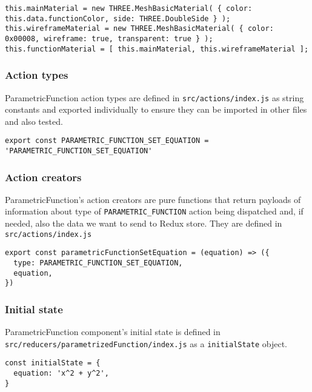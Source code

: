 \begin{lstlisting}[caption={\texttt{parametricfunction} A-Frame component init function.},captionpos=b]
this.mainMaterial = new THREE.MeshBasicMaterial( { color: this.data.functionColor, side: THREE.DoubleSide } );
this.wireframeMaterial = new THREE.MeshBasicMaterial( { color: 0x00008, wireframe: true, transparent: true } );
this.functionMaterial = [ this.mainMaterial, this.wireframeMaterial ];
\end{lstlisting}
    
\subsubsection{Action types}
ParametricFunction action types are defined in \texttt{src/actions/index.js} as string constants and exported individually to ensure they can be imported in other files and also tested.

\begin{lstlisting}[caption={\texttt{parametricFunction} action types.},captionpos=b]
export const PARAMETRIC_FUNCTION_SET_EQUATION = 'PARAMETRIC_FUNCTION_SET_EQUATION'
\end{lstlisting}

\subsubsection{Action creators}
ParametricFunction's action creators are pure functions that return payloads of information about type of \texttt{PARAMETRIC_FUNCTION} action being dispatched and, if needed, also the data we want to send to Redux store. They are defined in \texttt{src/actions/index.js}

\begin{lstlisting}[caption={Action for setting the function for 3D visualization.},captionpos=b]
export const parametricFunctionSetEquation = (equation) => ({
  type: PARAMETRIC_FUNCTION_SET_EQUATION,
  equation,
})
\end{lstlisting}

\subsubsection{Initial state}
ParametricFunction component's initial state is defined in \texttt{src/reducers/parametrizedFunction/index.js} as a \texttt{initialState} object.

\begin{lstlisting}[caption={Initial state of a \textsl{calculator}.},captionpos=b]
const initialState = {
  equation: 'x^2 + y^2',
}
\end{lstlisting}

